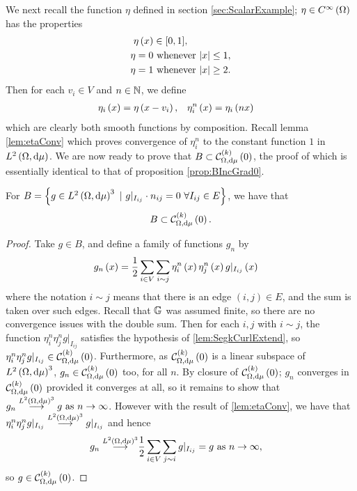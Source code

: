 We next recall the function $\eta$ defined in section \ref{sec:ScalarExample}; $\eta\in C^{\infty}\left( \Omega \right)$ has the properties
\begin{align*}
	\eta\left( x \right) &\in [0,1], \\
	\eta = 0 &\text{ whenever } \lvert x \rvert\leq 1, \\
	\eta = 1 &\text{ whenever } \lvert x \rvert\geq 2.
\end{align*}
Then for each $v_i\in V$ and $n\in\mathbb{N}$, we define
\begin{align*}
	\eta_i\left( x \right) = \eta\left( x-v_i \right), &\quad \eta_i^n\left( x \right) = \eta_i\left( nx \right)
\end{align*}
which are clearly both smooth functions by composition.
Recall lemma \ref{lem:etaConv} which proves convergence of $\eta_i^n$ to the constant function $1$ in $L^{2}\left( \Omega,\mathrm{d}\mu \right)$.
We are now ready to prove that $B\subset\mathcal{C}_{ \Omega, \mathrm{d}\mu}^{(k)}\left( 0 \right)$, the proof of which is essentially identical to that of proposition \ref{prop:BIncGrad0}.
\begin{prop} \label{prop:BInckCurl0}
	For $B = \clbracs{g\in\ltwo{\ddom}{\ddmes}^3 \ \vert \ g\vert_{I_{ij}}\cdot n_{ij} = 0 \ \forall I_{ij}\in E}$, we have that
	\begin{align*}
		B \subset \mathcal{C}_{ \Omega, \mathrm{d}\mu}^{(k)}\left( 0 \right).
	\end{align*}
\end{prop}
\begin{proof}
	Take $g\in B$, and define a family of functions $g_{n}$ by
	\begin{align*}
		g_{n}\left( x \right) &= \frac{1}{2}\sum_{i\in V}\sum_{i\sim j}\eta_{i}^{n}\left( x \right)\eta_{j}^{n}\left( x \right)g\vert_{I_{ij}}\left( x \right)
	\end{align*}
	where the notation $i\sim j$ means that there is an edge $(i,j)\in E$, and the sum is taken over such edges.
	Recall that $\mathbb{G}$ was assumed finite, so there are no convergence issues with the double sum.
	Then for each $i,j$ with $i\sim j$, the function $\eta_{i}^{n}\eta_{j}^{n}g\vert_{I_{ij}}$ satisfies the hypothesis of \ref{lem:SegkCurlExtend}, so $\eta_{i}^{n}\eta_{j}^{n}g\vert_{I_{ij}}\in\mathcal{C}_{ \Omega, \mathrm{d}\mu}^{(k)}\left( 0 \right)$.
	Furthermore, as $\mathcal{C}_{ \Omega, \mathrm{d}\mu}^{(k)}\left( 0 \right)$ is a linear subspace of $L^{2}\left( \Omega,\mathrm{d}\mu \right)^{3}$, $g_{n}\in\mathcal{C}_{ \Omega, \mathrm{d}\mu}^{(k)}\left( 0 \right)$ too, for all $n$.
	By closure of $\mathcal{C}_{ \Omega, \mathrm{d}\mu}^{(k)}\left( 0 \right)$; $g_{n}$ converges in $\mathcal{C}_{ \Omega, \mathrm{d}\mu}^{(k)}\left( 0 \right)$ provided it converges at all, so it remains to show that $g_{n}\overset{L^{2}\left( \Omega,\mathrm{d}\mu \right)^3}{\longrightarrow} g \ \text{as} \ n \rightarrow\infty$.
	However with the result of \ref{lem:etaConv}, we have that $\eta_{i}^{n}\eta_{j}^{n}g\vert_{I_{ij}}\overset{L^{2}\left( \Omega,\mathrm{d}\mu \right)^3}{\longrightarrow} g\vert_{I_{ij}}$ and hence
	\begin{align*}
		g_{n} \overset{L^{2}\left( \Omega,\mathrm{d}\mu \right)^3}{\longrightarrow} &\frac{1}{2}\sum_{i\in V}\sum_{j\sim i}g\vert_{I_{ij}} = g \ \text{as} \ n \rightarrow\infty,
	\end{align*}
	so $g\in\mathcal{C}_{ \Omega, \mathrm{d}\mu}^{(k)}\left( 0 \right)$.
\end{proof}

